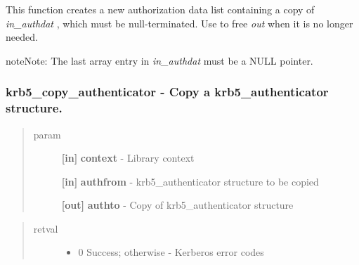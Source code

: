 \documentclass[letterpaper,10pt,english]{sphinxmanual}
\begin{document}
This function creates a new authorization data list containing a copy of \emph{in\_authdat} , which must be null-terminated. Use {\hyperref[appdev/refs/api/krb5_free_authdata:krb5_free_authdata]{}} to free \emph{out} when it is no longer needed.

\begin{notice}{note}{Note:}
The last array entry in \emph{in\_authdat} must be a NULL pointer.
\end{notice}


\subsubsection{krb5\_copy\_authenticator -  Copy a krb5\_authenticator structure.}
\label{appdev/refs/api/krb5_copy_authenticator:krb5-copy-authenticator-copy-a-krb5-authenticator-structure}\label{appdev/refs/api/krb5_copy_authenticator::doc}

\begin{fulllineitems}
\label{appdev/refs/api/krb5_copy_authenticator:krb5_copy_authenticator}
\end{fulllineitems}

\begin{quote}\begin{description}
\item[{param}] \leavevmode
\textbf{{[}in{]}} \textbf{context} - Library context

\textbf{{[}in{]}} \textbf{authfrom} - krb5\_authenticator structure to be copied

\textbf{{[}out{]}} \textbf{authto} - Copy of krb5\_authenticator structure

\end{description}\end{quote}
\begin{quote}\begin{description}
\item[{retval}] \leavevmode\begin{itemize}
\item {} 
0   Success; otherwise - Kerberos error codes

\end{itemize}

\end{description}\end{quote}
\end{document}
